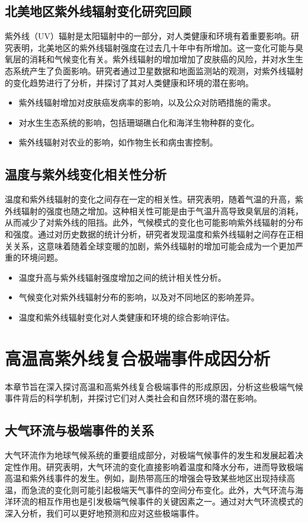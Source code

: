 \documentclass[12pt]{article}
\begin{document}
\subsection{北美地区紫外线辐射变化研究回顾}
紫外线（UV）辐射是太阳辐射中的一部分，对人类健康和环境有着重要影响。研究表明，北美地区的紫外线辐射强度在过去几十年中有所增加。这一变化可能与臭氧层的消耗和气候变化有关。紫外线辐射的增加增加了皮肤癌的风险，并对水生生态系统产生了负面影响。研究者通过卫星数据和地面监测站的观测，对紫外线辐射的变化趋势进行了分析，并探讨了其对人类健康和环境的潜在影响。

\begin{itemize}
\item 紫外线辐射增加对皮肤癌发病率的影响，以及公众对防晒措施的需求。
\item 对水生生态系统的影响，包括珊瑚礁白化和海洋生物种群的变化。
\item 紫外线辐射对农业的影响，如作物生长和病虫害控制。
\end{itemize}

\subsection{温度与紫外线变化相关性分析}
温度和紫外线辐射的变化之间存在一定的相关性。研究表明，随着气温的升高，紫外线辐射的强度也随之增加。这种相关性可能是由于气温升高导致臭氧层的消耗，从而减少了对紫外线的阻挡。此外，气候模式的变化也可能影响紫外线辐射的分布和强度。通过对历史数据的统计分析，研究者发现温度和紫外线辐射之间存在正相关关系，这意味着随着全球变暖的加剧，紫外线辐射的增加可能会成为一个更加严重的环境问题。

\begin{itemize}
\item 温度升高与紫外线辐射强度增加之间的统计相关性分析。
\item 气候变化对紫外线辐射分布的影响，以及对不同地区的影响差异。
\item 温度和紫外线辐射变化对人类健康和环境的综合影响评估。
\end{itemize}



\section{高温高紫外线复合极端事件成因分析}
本章节旨在深入探讨高温和高紫外线复合极端事件的形成原因，分析这些极端气候事件背后的科学机制，并探讨它们对人类社会和自然环境的潜在影响。

\subsection{大气环流与极端事件的关系}
大气环流作为地球气候系统的重要组成部分，对极端气候事件的发生和发展起着决定性作用。研究表明，大气环流的变化直接影响着温度和降水分布，进而导致极端高温和紫外线事件的发生。例如，副热带高压的增强会导致某些地区出现持续高温，而急流的变化则可能引起极端天气事件的空间分布变化。此外，大气环流与海洋环流的相互作用也是引发极端气候事件的关键因素之一。通过对大气环流模式的深入分析，我们可以更好地预测和应对这些极端事件。
\end{document}

